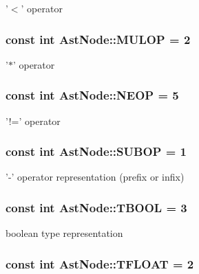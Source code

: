 \label{classAstNode_a1ddf9dbcce4b80d311e7080b8262b65b}
'$<$' operator \hypertarget{classAstNode_af1564bffc1a770122ea56654f4439531}{
\subsubsection[{MULOP}]{\setlength{\rightskip}{0pt plus 5cm}const int {\bf AstNode::MULOP} = 2}}
\label{classAstNode_af1564bffc1a770122ea56654f4439531}
'$\ast$' operator \hypertarget{classAstNode_a3347eacf3e38675c075a7ce1c4cb6e29}{
\subsubsection[{NEOP}]{\setlength{\rightskip}{0pt plus 5cm}const int {\bf AstNode::NEOP} = 5}}
\label{classAstNode_a3347eacf3e38675c075a7ce1c4cb6e29}
'!=' operator \hypertarget{classAstNode_a8d62c361a16d84b762172fac68650561}{
\subsubsection[{SUBOP}]{\setlength{\rightskip}{0pt plus 5cm}const int {\bf AstNode::SUBOP} = 1}}
\label{classAstNode_a8d62c361a16d84b762172fac68650561}
'-\/' operator representation (prefix or infix) \hypertarget{classAstNode_a71904f4c33eff3bb3a37fadda88f12c9}{
\subsubsection[{TBOOL}]{\setlength{\rightskip}{0pt plus 5cm}const int {\bf AstNode::TBOOL} = 3}}
\label{classAstNode_a71904f4c33eff3bb3a37fadda88f12c9}
boolean type representation \hypertarget{classAstNode_abf470f775bd7a7bfc2c0610716054339}{
\subsubsection[{TFLOAT}]{\setlength{\rightskip}{0pt plus 5cm}const int {\bf AstNode::TFLOAT} = 2}}
